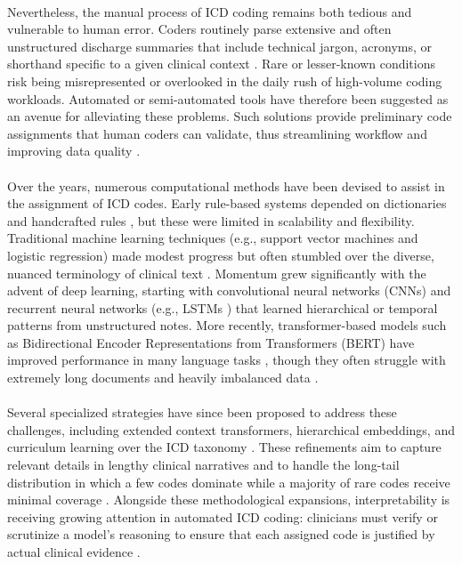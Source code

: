 \paragraph{}
Nevertheless, the manual process of ICD coding remains both tedious and vulnerable to human error. Coders routinely parse extensive and often unstructured discharge summaries that include technical jargon, acronyms, or shorthand specific to a given clinical context \citep{wrenn2010quantifying}. Rare or lesser-known conditions risk being misrepresented or overlooked in the daily rush of high-volume coding workloads. Automated or semi-automated tools have therefore been suggested as an avenue for alleviating these problems. Such solutions provide preliminary code assignments that human coders can validate, thus streamlining workflow and improving data quality \citep{campbell2020computer}.

\paragraph{}
Over the years, numerous computational methods have been devised to assist in the assignment of ICD codes. Early rule-based systems depended on dictionaries and handcrafted rules \citep{farkas2008automatic}, but these were limited in scalability and flexibility. Traditional machine learning techniques (e.g., support vector machines and logistic regression) made modest progress but often stumbled over the diverse, nuanced terminology of clinical text \citep{scheurwegs2017data,perotte2014diagnosis}. Momentum grew significantly with the advent of deep learning, starting with convolutional neural networks (CNNs) \citep{kim2014convolutional,mullenbach2018explainable} and recurrent neural networks (e.g., LSTMs \citep{hochreiter1997long}) that learned hierarchical or temporal patterns from unstructured notes. More recently, transformer-based models such as Bidirectional Encoder Representations from Transformers (BERT) have improved performance in many language tasks \citep{devlin2019bert}, though they often struggle with extremely long documents and heavily imbalanced data \citep{gao2021limitations,huang2022plm}.

\paragraph{}
Several specialized strategies have since been proposed to address these challenges, including extended context transformers, hierarchical embeddings, and curriculum learning over the ICD taxonomy \citep{nickel2017poincare,ren2022hicu,bengio2009curriculum}. These refinements aim to capture relevant details in lengthy clinical narratives and to handle the long-tail distribution in which a few codes dominate while a majority of rare codes receive minimal coverage \citep{rios2018few}. Alongside these methodological expansions, interpretability is receiving growing attention in automated ICD coding: clinicians must verify or scrutinize a model’s reasoning to ensure that each assigned code is justified by actual clinical evidence \citep{holzinger2017we,warner2024modernbert}. 

